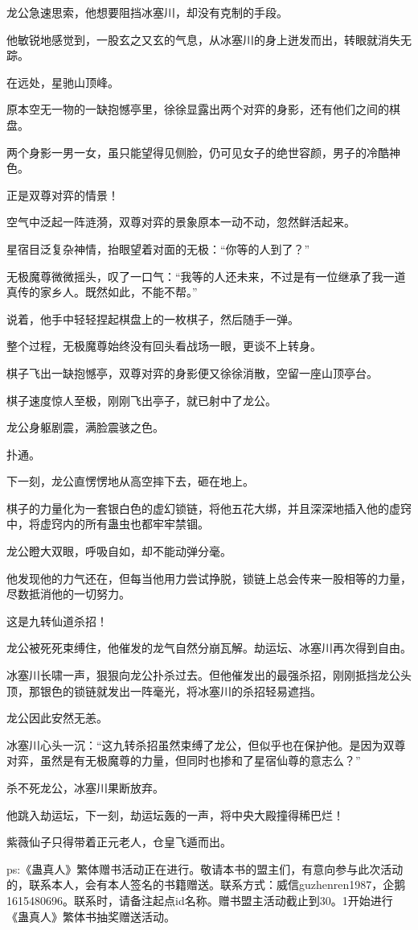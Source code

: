 \begin{this_body}
龙公急速思索，他想要阻挡冰塞川，却没有克制的手段。

他敏锐地感觉到，一股玄之又玄的气息，从冰塞川的身上迸发而出，转眼就消失无踪。

在远处，星驰山顶峰。

原本空无一物的一缺抱憾亭里，徐徐显露出两个对弈的身影，还有他们之间的棋盘。

两个身影一男一女，虽只能望得见侧脸，仍可见女子的绝世容颜，男子的冷酷神色。

正是双尊对弈的情景！

空气中泛起一阵涟漪，双尊对弈的景象原本一动不动，忽然鲜活起来。

星宿目泛复杂神情，抬眼望着对面的无极：“你等的人到了？”

无极魔尊微微摇头，叹了一口气：“我等的人还未来，不过是有一位继承了我一道真传的家乡人。既然如此，不能不帮。”

说着，他手中轻轻捏起棋盘上的一枚棋子，然后随手一弹。

整个过程，无极魔尊始终没有回头看战场一眼，更谈不上转身。

棋子飞出一缺抱憾亭，双尊对弈的身影便又徐徐消散，空留一座山顶亭台。

棋子速度惊人至极，刚刚飞出亭子，就已射中了龙公。

龙公身躯剧震，满脸震骇之色。

扑通。

下一刻，龙公直愣愣地从高空摔下去，砸在地上。

棋子的力量化为一套银白色的虚幻锁链，将他五花大绑，并且深深地插入他的虚窍中，将虚窍内的所有蛊虫也都牢牢禁锢。

龙公瞪大双眼，呼吸自如，却不能动弹分毫。

他发现他的力气还在，但每当他用力尝试挣脱，锁链上总会传来一股相等的力量，尽数抵消他的一切努力。

这是九转仙道杀招！

龙公被死死束缚住，他催发的龙气自然分崩瓦解。劫运坛、冰塞川再次得到自由。

冰塞川长啸一声，狠狠向龙公扑杀过去。但他催发出的最强杀招，刚刚抵挡龙公头顶，那银色的锁链就发出一阵毫光，将冰塞川的杀招轻易遮挡。

龙公因此安然无恙。

冰塞川心头一沉：“这九转杀招虽然束缚了龙公，但似乎也在保护他。是因为双尊对弈，虽然是有无极魔尊的力量，但同时也掺和了星宿仙尊的意志么？”

杀不死龙公，冰塞川果断放弃。

他跳入劫运坛，下一刻，劫运坛轰的一声，将中央大殿撞得稀巴烂！

紫薇仙子只得带着正元老人，仓皇飞遁而出。

ps:《蛊真人》繁体赠书活动正在进行。敬请本书的盟主们，有意向参与此次活动的，联系本人，会有本人签名的书籍赠送。联系方式：威信guzhenren1987，企鹅1615480696。联系时，请备注起点id名称。赠书盟主活动截止到30。1开始进行《蛊真人》繁体书抽奖赠送活动。

\end{this_body}

